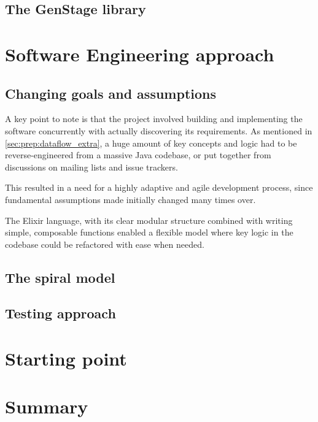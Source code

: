 \subsection{The GenStage library}


\section{Software Engineering approach}\label{sec:prep:softeng}

\subsection{Changing goals and assumptions}

A key point to note is that the project involved building and implementing the software concurrently with actually discovering its requirements.
As mentioned in \cref{sec:prep:dataflow_extra}, a huge amount of key concepts and logic had to be reverse-engineered from a massive Java codebase, or put together from discussions on mailing lists and issue trackers.

This resulted in a need for a highly adaptive and agile development process, since fundamental assumptions made initially changed many times over.


The Elixir language, with its clear modular structure combined with writing simple, composable functions enabled a flexible model where key logic in the codebase could be refactored with ease when needed.

\subsection{The spiral model}


\subsection{Testing approach}


\section{Starting point}\label{sec:prep:starting}


\section{Summary}\label{sec:prep:summary}